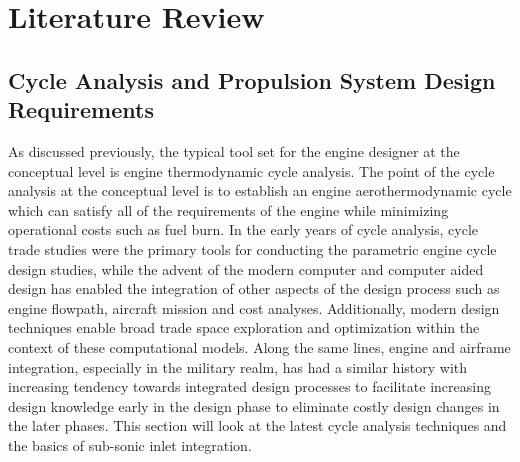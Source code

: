 \chapter{Literature Review}
	\setcounter{secnumdepth}{2}
		\section{Cycle Analysis and Propulsion System Design Requirements}
		As discussed previously, the typical tool set for the engine designer at the conceptual level is engine thermodynamic cycle analysis.  The point of the cycle analysis at the conceptual level is to establish an engine aerothermodynamic cycle which can satisfy all of the requirements of the engine while minimizing operational costs such as fuel burn.  In the early years of cycle analysis, cycle trade studies were the primary tools for conducting the parametric engine cycle design studies, while the advent of the modern computer and computer aided design has enabled the integration of other aspects of the design process such as engine flowpath, aircraft mission and cost analyses.  Additionally, modern design techniques enable broad trade space exploration and optimization within the context of these computational models.  Along the same lines, engine and airframe integration, especially in the military realm, has had a similar history with increasing tendency towards integrated design processes to facilitate increasing design knowledge early in the design phase to eliminate costly design changes in the later phases.  This section will look at the latest cycle analysis techniques and the basics of sub-sonic inlet integration.
		
